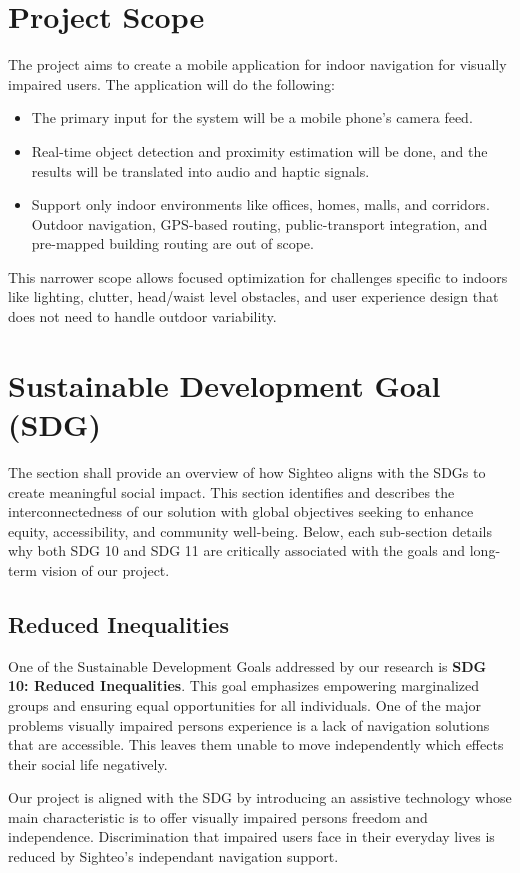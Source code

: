 \documentclass{FastFyp}
\begin{document}
\section{Project Scope}
The project aims to create a mobile application for indoor navigation for visually impaired users. The application will do the following:

\begin{itemize}
    \item The primary input for the system will be a mobile phone's camera feed.
    \item Real-time object detection and proximity estimation will be done, and the results will be translated into audio and haptic signals.
    \item Support only indoor environments like offices, homes, malls, and corridors. Outdoor navigation, GPS-based
 routing, public-transport integration, and pre-mapped building routing are out of scope.
\end{itemize}
This narrower scope allows focused optimization for challenges specific to indoors like lighting, clutter, head/waist
level obstacles, and user experience design that does not need to handle outdoor variability.
\section{Sustainable Development Goal (SDG)}
The section shall provide an overview of how Sighteo aligns with the SDGs to create meaningful social impact. This section identifies and describes the interconnectedness of our solution with global objectives seeking to enhance equity, accessibility, and community well-being. Below, each sub-section details why both SDG 10 and SDG 11 are critically associated with the goals and long-term vision of our project.   
\subsection{Reduced Inequalities}
One of the Sustainable Development Goals addressed by our research is \textbf{SDG 10: Reduced Inequalities}. This goal emphasizes empowering marginalized groups and ensuring equal opportunities for all individuals. One of the major problems visually impaired persons experience is a lack of navigation solutions that are accessible. This leaves them unable to move independently which effects their social life negatively.

Our project is aligned with the SDG by introducing an assistive technology whose main characteristic is to offer visually impaired persons freedom and independence. Discrimination that impaired users face in their everyday lives is reduced by Sighteo's independant navigation support.
\end{document}
